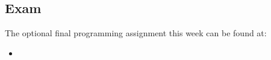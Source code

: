 \subsection{Exam}

The optional final programming assignment this week can be found at:

\begin{itemize}
    \item {}
\end{itemize}
